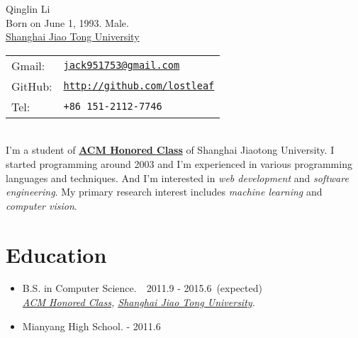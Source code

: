 \documentclass[letterpaper]{article}
\def\name{Qinglin Li}
\begin{document}
\begin{minipage}{0.4\linewidth}
  {\huge \name }
  \vspace{0.1in} \\
  Born on June 1, 1993. Male. \\
  \href{http://www.sjtu.edu.cn/}{Shanghai Jiao Tong University}
\end{minipage}
\begin{minipage}{0.45\linewidth}
  \begin{tabular}{ll}
    Gmail:  & \href{mailto:jack951753@gmail.com}{\tt jack951753@gmail.com} \\
    GitHub: & \href{https://github.com/lostleaf}{\tt http://github.com/lostleaf} \\
    Tel:    & {\tt +86 151-2112-7746}
  \end{tabular}
\end{minipage}

~\\
I'm a student of \textbf{\href{http://acm.sjtu.edu.cn}{ACM Honored Class}} of Shanghai Jiaotong University.
I started programming around 2003 and I'm experienced in various programming languages and techniques.
And I'm interested in \emph{web development} and \emph{software engineering}.
My primary research interest includes \emph{machine learning} and \emph{computer vision}.
\section*{Education}
\begin{itemize}

\item  B.S. in Computer Science.~\quad\qquad~2011.9 - 2015.6~(expected) \\
    \emph{\href{http://acm.sjtu.edu.cn}{ACM Honored Class},
    \href{http://www.sjtu.edu.cn/}{Shanghai Jiao Tong University}.}
\item
    Mianyang High School.\qquad\qquad{} - 2011.6
\end{itemize}
\end{document}
